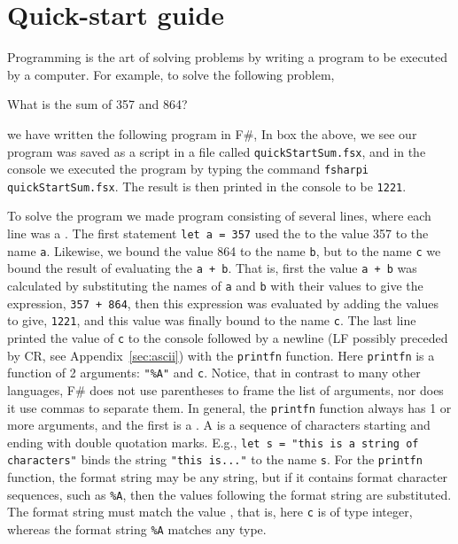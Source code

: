 \chapter{Quick-start guide}
Programming is the art of solving problems by writing a program to be executed by a computer. For example, to solve the following problem,
%
\begin{problem}
  What is the sum of 357 and 864?
\end{problem}
%
we have written the following program in F\#,
%
%
In box the above, we see our program was saved as a script in a file called \texttt{quickStartSum.fsx}, and in the console we executed the program by typing the command \lstinline|fsharpi quickStartSum.fsx|. The result is then printed in the console to be \texttt{1221}.

To solve the program we made program consisting of several lines, where each line was a . The first statement \lstinline|let a = 357| used the   to  the value 357 to the name \lstinline|a|. Likewise, we bound the value 864 to the name \lstinline|b|, but to the name \lstinline|c| we bound the result of evaluating the  \lstinline|a + b|. That is, first the value \lstinline|a + b| was calculated by substituting the names of \lstinline|a| and \lstinline|b| with their values to give the expression, \lstinline|357 + 864|, then this expression was evaluated by adding the values to give, \lstinline|1221|, and this value was finally bound to the name \lstinline|c|. The last line printed the value of \lstinline|c| to the console followed by a newline (LF possibly preceded by CR, see Appendix~\ref{sec:ascii}) with the \lstinline|printfn| function. Here \lstinline|printfn| is a function of 2 arguments: \lstinline|"%A"| and \lstinline|c|. Notice, that in contrast to many other languages, F\# does not use parentheses to frame the list of arguments, nor does it use commas to separate them. In general, the \lstinline|printfn| function always has 1 or more arguments, and the first is a . A  is a sequence of characters starting and ending with double quotation marks. E.g., \lstinline|let s = "this is a string of characters"| binds the string \lstinline|"this is..."| to the name \lstinline|s|. For the \lstinline|printfn| function, the format string may be any string, but if it contains format character sequences, such as \lstinline|%A|, then the values following the format string are substituted. The format string must match the value , that is, here \lstinline|c| is of type integer, whereas the format string \lstinline|%A| matches any type.

